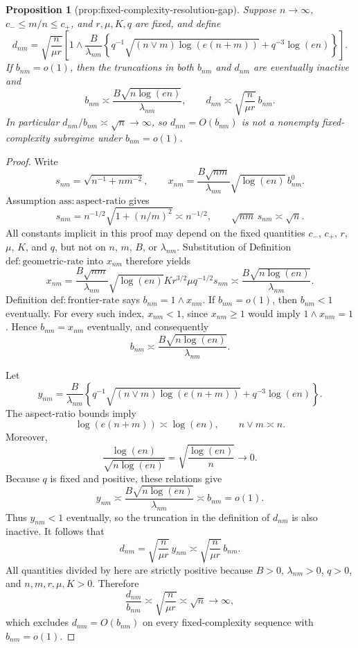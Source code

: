 \documentclass{article}
\newtheorem{proposition}{Proposition}
\begin{document}
\begin{proposition}[prop:fixed-complexity-resolution-gap]\label{prop:fixed-complexity-resolution-gap}
Suppose \(n\to\infty\), \(c_-\le m/n\le c_+\), and \(r,\mu,K,q\) are fixed, and define
\[
 d_{nm}=\sqrt{\frac n{\mu r}}\left[1\wedge
 \frac B{\lambda_{nm}}\left\{
 q^{-1}\sqrt{(n\vee m)\log(e(n+m))}+q^{-3}\log(en)
 \right\}\right].
\]
If \(b_{nm}=o(1)\), then the truncations in both \(b_{nm}\) and \(d_{nm}\) are eventually inactive and
\[
 b_{nm}\asymp\frac{B\sqrt{n\log(en)}}{\lambda_{nm}},
 \qquad
 d_{nm}\asymp\sqrt{\frac n{\mu r}}\,b_{nm}.
\]
In particular \(d_{nm}/b_{nm}\asymp\sqrt n\to\infty\), so \(d_{nm}=O(b_{nm})\) is not a nonempty fixed-complexity subregime under \(b_{nm}=o(1)\).
\end{proposition}
\begin{proof}
Write
\[
 s_{nm}=\sqrt{n^{-1}+nm^{-2}},\qquad
 x_{nm}=\frac{B\sqrt{nm}}{\lambda_{nm}}\sqrt{\log(en)}\,b^0_{nm}.
\]
Assumption \(\mathrm{ass:aspect\mbox{-}ratio}\) gives
\[
 s_{nm}=n^{-1/2}\sqrt{1+(n/m)^2}\asymp n^{-1/2},
 \qquad
 \sqrt{nm}\,s_{nm}\asymp\sqrt n.
\]
All constants implicit in this proof may depend on the fixed quantities
\(c_-\), \(c_+\), \(r\), \(\mu\), \(K\), and \(q\), but not on
\(n\), \(m\), \(B\), or \(\lambda_{nm}\).  Substitution of Definition
\(\mathrm{def:geometric\mbox{-}rate}\) into \(x_{nm}\) therefore yields
\[
 x_{nm}
 =\frac{B\sqrt{nm}}{\lambda_{nm}}\sqrt{\log(en)}
 K r^{3/2}\mu q^{-1/2}s_{nm}
 \asymp \frac{B\sqrt{n\log(en)}}{\lambda_{nm}}.
\]
Definition \(\mathrm{def:frontier\mbox{-}rate}\) says
\(b_{nm}=1\wedge x_{nm}\).  If \(b_{nm}=o(1)\), then
\(b_{nm}<1\) eventually.  For every such index, \(x_{nm}<1\), since
\(x_{nm}\ge1\) would imply \(1\wedge x_{nm}=1\).  Hence
\(b_{nm}=x_{nm}\) eventually, and consequently
\[
 b_{nm}\asymp\frac{B\sqrt{n\log(en)}}{\lambda_{nm}}.
\]

Let
\[
 y_{nm}=\frac B{\lambda_{nm}}
 \left\{q^{-1}\sqrt{(n\vee m)\log(e(n+m))}
 +q^{-3}\log(en)\right\}.
\]
The aspect-ratio bounds imply
\[
 \log(e(n+m))\asymp\log(en),
 \qquad n\vee m\asymp n.
\]
Moreover,
\[
 \frac{\log(en)}{\sqrt{n\log(en)}}
 =\sqrt{\frac{\log(en)}n}\longrightarrow0.
\]
Because \(q\) is fixed and positive, these relations give
\[
 y_{nm}\asymp
 \frac{B\sqrt{n\log(en)}}{\lambda_{nm}}
 \asymp b_{nm}=o(1).
\]
Thus \(y_{nm}<1\) eventually, so the truncation in the definition of
\(d_{nm}\) is also inactive.  It follows that
\[
 d_{nm}=\sqrt{\frac n{\mu r}}\,y_{nm}
 \asymp\sqrt{\frac n{\mu r}}\,b_{nm}.
\]
All quantities divided by here are strictly positive because
\(B>0\), \(\lambda_{nm}>0\), \(q>0\), and \(n,m,r,\mu,K>0\).
Therefore
\[
 \frac{d_{nm}}{b_{nm}}\asymp
 \sqrt{\frac n{\mu r}}\asymp\sqrt n\longrightarrow\infty,
\]
which excludes \(d_{nm}=O(b_{nm})\) on every fixed-complexity sequence
with \(b_{nm}=o(1)\).
\end{proof}
\end{document}
